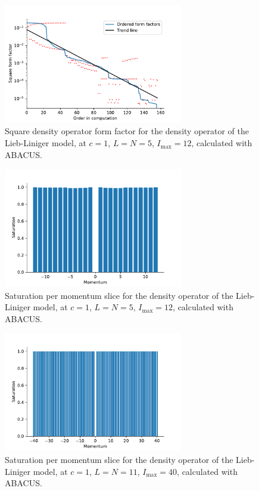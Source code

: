 \documentclass[11pt, a4paper]{report} %
\begin{document}
\begin{figure}[tb!]
  \centering
  \includegraphics[width=0.7\textwidth]{abacus_ff_sq_12_5.pdf}
  \caption{Square density operator form factor for the density operator of the Lieb-Liniger model, at \(c=1\), \(L=N=5\), \(I_{\max}=12\), calculated with ABACUS.}\label{fig:abacusformfactors_12_5}
\end{figure}

\begin{figure}[tb!]
  \centering
  \includegraphics[width=0.7\textwidth]{abacus_saturations_12_5.pdf}
  \caption{Saturation per momentum slice for the density operator of the Lieb-Liniger model, at \(c=1\), \(L=N=5\), \(I_{\max}=12\), calculated with ABACUS.}\label{fig:abacus_saturations_12_5}
\end{figure}

\begin{figure}[tb!]
  \centering
  \includegraphics[width=0.7\textwidth]{abacus_saturations.pdf}
  \caption{Saturation per momentum slice for the density operator of the Lieb-Liniger model, at \(c=1\), \(L=N=11\), \(I_{\max}=40\), calculated with ABACUS.}\label{fig:abacus_saturations}
\end{figure}
\end{document}
